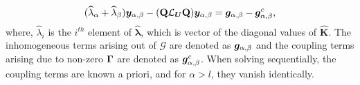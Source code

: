 \begin{align}
	\label{eqn:coupled_fields_app}
	(\widehat{\lambda}_{\alpha} + \widehat{\lambda}_{\beta})\boldsymbol{y}_{\alpha,\beta} 
	- (\mathbf{Q}\mathcal{L}_{\boldsymbol{U}}\mathbf{Q})\boldsymbol{y}_{\alpha,\beta} = \boldsymbol{g}_{\alpha,\beta} - \boldsymbol{g}^{c}_{\alpha,\beta},
\end{align}
where, $\widehat{\lambda}_{i}$ is the $i^{th}$ element of $\widehat{\boldsymbol{\lambda}}$, which is vector of the diagonal values of $\mathbf{\widehat{K}}$. The inhomogeneous terms arising out of $\mathcal{G}$ are denoted as $\boldsymbol{g}_{\alpha,\beta}$ and the coupling terms arising due to non-zero $\mathbf{\Gamma}$ are denoted as $\boldsymbol{g}^{c}_{\alpha,\beta}$. When solving sequentially, the coupling terms are known a priori, and for $\alpha > l$, they vanish identically. 
 


